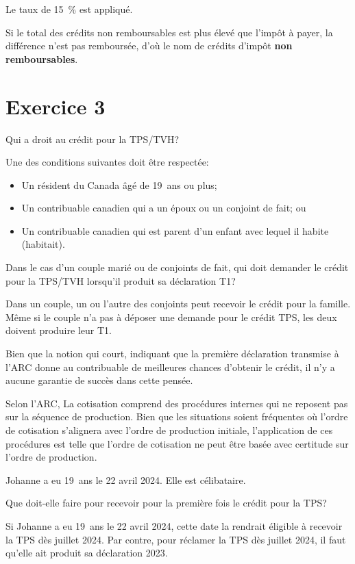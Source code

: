 Le taux de 15~\% est appliqué. 


Si le total des crédits non remboursables est plus élevé que l'impôt à payer, la différence n'est pas remboursée, d'où le nom de crédits d'impôt \textbf{non remboursables}.



\section{Exercice 3}
\setcounter{question}{0}
\begin{question}
	Qui a droit au crédit pour la TPS/TVH?
\end{question}
Une des conditions suivantes doit être respectée:
\begin{itemize}
	\item Un résident du Canada âgé de 19~ans ou plus;
	\item Un contribuable canadien qui a un époux ou un conjoint de fait; ou
	\item Un contribuable canadien qui est parent d'un enfant avec lequel il habite (habitait).
\end{itemize}

\begin{question}
	Dans le cas d'un couple marié ou de conjoints de fait, qui doit demander le crédit pour la TPS/TVH lorsqu'il produit sa déclaration T1?
\end{question}
Dans un couple, un ou l'autre des conjoints peut recevoir le crédit pour la famille. Même si le couple n'a pas à déposer une demande pour le crédit TPS, les deux doivent produire leur T1.

Bien que la notion qui court, indiquant que la première déclaration transmise à l'ARC donne au contribuable de meilleures chances d'obtenir le crédit, il n'y a aucune garantie de succès dans cette pensée.

Selon l'ARC, \og La cotisation comprend des procédures internes qui ne reposent pas sur la séquence de production. Bien que les situations soient fréquentes où l'ordre de cotisation s'alignera avec l'ordre de production initiale, l'application de ces procédures est telle que l'ordre de cotisation ne peut être basée avec certitude sur l'ordre de production. \fg{}

\begin{question}
	Johanne a eu 19~ans le 22 avril 2024. Elle est célibataire.
	
	Que doit-elle faire pour recevoir pour la première fois le crédit pour la TPS?
\end{question}
Si Johanne a eu 19~ans le 22 avril 2024, cette date la rendrait éligible à recevoir la TPS dès juillet 2024. Par contre, pour réclamer la TPS dès juillet 2024, il faut qu'elle ait produit sa déclaration 2023.

